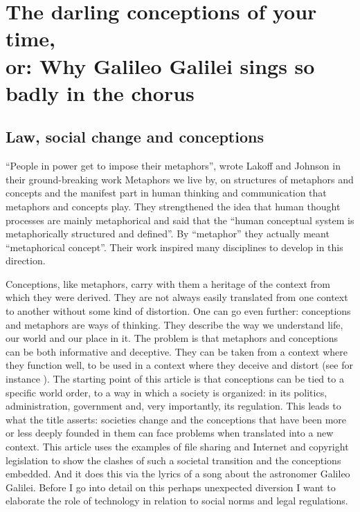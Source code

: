 \begin{savequote}
\end{savequote}
\chapter[The darling conceptions of your time]{The darling conceptions of your
time,\\ \Large{or: Why Galileo Galilei sings so badly in the chorus}}
\label{c:darling_conceptions}


\section{Law, social change and conceptions}
\label{s:darling_conceptions:law_social_change_concetions}

``People in power get to impose their metaphors'', wrote Lakof\hbox{}f and Johnson in
their ground-breaking work Metaphors we live by, on structures of metaphors and
concepts and the manifest part in human thinking and communication that
metaphors and concepts play. They strengthened the idea that human thought
processes are mainly metaphorical and said that the ``human conceptual system is
metaphorically structured and def\hbox{}ined''. By ``metaphor'' they actually meant
``metaphorical concept''\cite{darling-lakoff_johnson80}. Their work inspired
many disciplines to develop in this direction. 

Conceptions, like metaphors, carry with them a heritage of the context from
which they were derived. They are not always easily translated from one context
to another without some kind of distortion. One can go even further: conceptions
and metaphors are ways of thinking. They describe the way we understand life,
our world and our place in it. The problem is that metaphors and conceptions can
be both informative and deceptive. They can be taken from a context where they
function well, to be used in a context where they deceive and distort (see for
instance \cite{darling-morgan99}). The starting point of this article is that
conceptions can be tied to a specif\hbox{}ic world order, to a way in which a society
is organized: in its politics, administration, government and, very importantly,
its regulation. This leads to what the title asserts: societies change and the
conceptions that have been more or less deeply founded in them can face problems
when translated into a new context. This article uses the examples of f\hbox{}ile
sharing and Internet and copyright legislation to show the clashes of such a
societal transition and the conceptions embedded. And it does this via the
lyrics of a song about the astronomer Galileo Galilei. Before I go into detail
on this perhaps unexpected diversion I want to elaborate the role of technology
in relation to social norms and legal regulations. 

